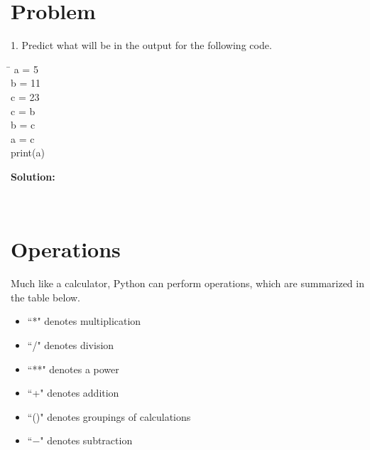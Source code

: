 \documentclass{article}
\begin{document}
\section{Problem}
1. Predict what will be in the output for the following code.
\begin{tcolorbox}
	\ttfamily
	\begin{tabbing}
		\hspace{3.25 in}\=\hspace{3.25 in} \kill
		a = 5\\
		b = 11\\
		c = 23\\
		c = b\\
		b = c\\
		a = c\\
		print(a)
	\end{tabbing}
\end{tcolorbox}
\noindent\textbf{Solution:}
\begin{tcolorbox}[colback=output]
	\ttfamily 
	\phantom{11}\\
\end{tcolorbox}
\section{Operations}
Much like a calculator, Python can perform operations, which are summarized in the table below.
\begin{multicols}{2}
\begin{itemize}
	\item ``*" denotes multiplication
	\item ``/" denotes division
	\item ``**" denotes a power
	\item ``+" denotes addition
	\item ``()" denotes groupings of calculations
	\item ``$-$" denotes subtraction
	
\end{itemize}
\end{multicols}
\end{document}
